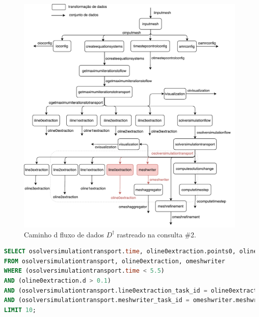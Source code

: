 \begin{figure}[htb]
    \centering
    \includegraphics[width=\textwidth]{img/experiments-dataflow-2}
    \caption[Caminho do fluxo de dados \(D^{\dagger}\) rastreado na consulta \#2]{Caminho d fluxo de dados \(D^{\dagger}\) rastreado na consulta \#2.}%
    \label{fig:experiments-dataflow-2}
\end{figure}

\begin{minipage}[c]{0.95\textwidth}
\begin{lstlisting}[language=sql,label={lst:experiments-2-sql},caption={[Código em SQL gerado na consulta~\#2]Código em SQL gerado na consulta~\#2 (15,45~ms).}]
SELECT osolversimulationtransport.time, oline0extraction.points0, oline0extraction.points1, oline0extraction.points2, oline0extraction.d
FROM osolversimulationtransport, oline0extraction, omeshwriter
WHERE (osolversimulationtransport.time < 5.5) 
AND (oline0extraction.d > 0.1) 
AND (osolversimulationtransport.line0extraction_task_id = oline0extraction.line0extraction_task_id) 
AND (osolversimulationtransport.meshwriter_task_id = omeshwriter.meshwriter_task_id)
LIMIT 10;
\end{lstlisting}
\end{minipage}

